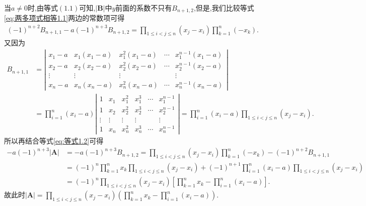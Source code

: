 \documentclass[lang=cn,newtx,10pt,scheme=chinese]{elegantbook}
\begin{document}
\begin{solution}
当\(a\neq 0\)时,由等式\((1.1)\)可知,\(|\boldsymbol{B}|\)中\(y\)前面的系数不只有\(B_{n + 1,2}\),但是,我们比较等式\eqref{eq:两多项式相等1.1}两边的常数项可得
\begin{align}\label{eq:等式1.2}
    (-1)^{n + 2}B_{n + 1,1}-a(-1)^{n + 3}B_{n + 1,2}=\prod_{1\leqslant i < j\leqslant n}(x_j - x_i)\prod_{k = 1}^{n}(-x_k).
\end{align}
又因为
\begin{align*}
    B_{n + 1,1}&=\left|\begin{matrix}
x_1 - a & x_1(x_1 - a) & x_{1}^{2}(x_1 - a) & \cdots & x_{1}^{n - 1}(x_1 - a)\\
x_2 - a & x_2(x_2 - a) & x_{2}^{2}(x_2 - a) & \cdots & x_{2}^{n - 1}(x_2 - a)\\
\vdots & \vdots & \vdots &  & \vdots\\
x_n - a & x_n(x_n - a) & x_{n}^{2}(x_n - a) & \cdots & x_{n}^{n - 1}(x_n - a)
\end{matrix}\right|
\\
&=\prod_{i = 1}^{n}(x_i - a)\left|\begin{matrix}
1 & x_1 & x_{1}^{2} & x_{1}^{3} & \cdots & x_{1}^{n - 1}\\
1 & x_2 & x_{2}^{2} & x_{2}^{3} & \cdots & x_{2}^{n - 1}\\
\vdots & \vdots & \vdots & \vdots &  & \vdots\\
1 & x_n & x_{n}^{2} & x_{n}^{3} & \cdots & x_{n}^{n - 1}
\end{matrix}\right|=\prod_{i = 1}^{n}(x_i - a)\prod_{1\leqslant i < j\leqslant n}(x_j - x_i).
\end{align*}
所以再结合等式\eqref{eq:等式1.2}可得
\begin{align*}
    -a(-1)^{n + 3}|\boldsymbol{A}|&=-a(-1)^{n + 3}B_{n + 1,2}=\prod_{1\leqslant i < j\leqslant n}(x_j - x_i)\prod_{k = 1}^{n}(-x_k)-(-1)^{n + 2}B_{n + 1,1}
    \\
    &=(-1)^n\prod_{k = 1}^{n}x_k\prod_{1\leqslant i < j\leqslant n}(x_j - x_i)+(-1)^{n + 1}\prod_{i = 1}^{n}(x_i - a)\prod_{1\leqslant i < j\leqslant n}(x_j - x_i)
    \\
    &=(-1)^n\prod_{1\leqslant i < j\leqslant n}(x_j - x_i)\left[\prod_{k = 1}^{n}x_k-\prod_{i = 1}^{n}(x_i - a)\right].
\end{align*}
故此时\(|\boldsymbol{A}|=\prod_{1\leqslant i < j\leqslant n}(x_j - x_i)\left(\prod_{k = 1}^{n}x_k-\prod_{i = 1}^{n}(x_i - a)\right)\).
\end{solution}
\end{document}
